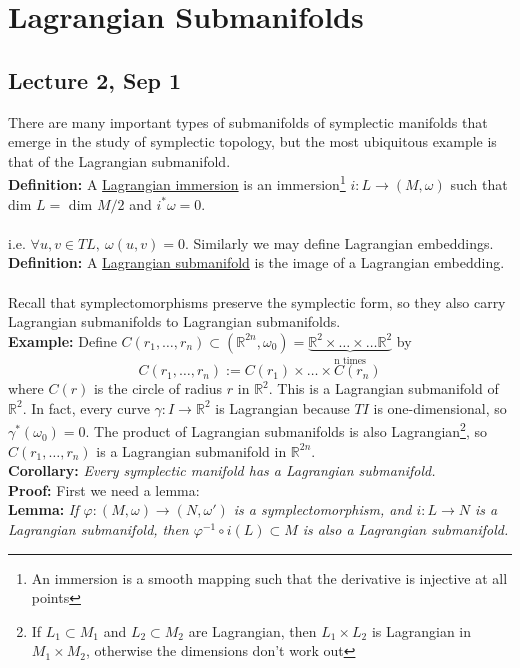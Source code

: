 \documentclass[12pt]{report}
\theoremstyle{definition}
\theoremstyle{remark}
\numberwithin{equation}{section}
\theoremstyle{definition}
\newcommand{\inv}[1]{#1^{-1}}
\newcommand{\bb}[1]{\mathbb{#1}}
\begin{document}
\chapter{Lagrangian Submanifolds}
\section*{Lecture 2, Sep 1}
\label{sec:2}
There are many important types of submanifolds of symplectic manifolds that emerge in the study of symplectic topology, but the most ubiquitous example is that of the Lagrangian submanifold. \\
\textbf{Definition: }A \underline{Lagrangian immersion} is an immersion\footnote{An immersion is a smooth mapping such that the derivative is injective at all points} $i: L \to (M,\omega)$ such that dim $L = $ dim $M/2$ and $i^* \omega = 0$. \\\\
i.e. $\forall u,v \in TL,\ \omega(u,v) = 0$. Similarly we may define Lagrangian embeddings.\\
\textbf{Definition: }A \underline{Lagrangian submanifold} is the image of a Lagrangian embedding. \\\\
Recall that symplectomorphisms preserve the symplectic form, so they also carry Lagrangian submanifolds to Lagrangian submanifolds. \\
\textbf{Example: } Define $C(r_1,\dots,r_n) \subset (\bb R^{2n},\omega_0) = \underbrace{\bb R^2 \times \dots \times \dots\bb R^2 }_{\text{n times}}$ by 
$$
	C(r_1,\dots,r_n) := C(r_1) \times \dots \times C(r_n)
$$
where $C(r)$ is the circle of radius $r$ in $\bb R^2$. This is  a Lagrangian submanifold of $\bb R^2$. In fact, every curve $\gamma: I \to \bb R^2$ is Lagrangian because $TI$ is one-dimensional, so $\gamma^*(\omega_0) = 0$. The product of Lagrangian submanifolds is also Lagrangian\footnote{If $L_1 \subset M_1$ and $L_2 \subset M_2$ are Lagrangian, then $L_1 \times L_2$ is Lagrangian in $M_1 \times M_2$, otherwise the dimensions don't work out}, so $C(r_1,\dots,r_n)$ is a Lagrangian submanifold in $\bb R^{2n}$. \\
\textbf{Corollary: }\textit{Every symplectic manifold has a Lagrangian submanifold.}\\
\textbf{Proof: }First we need a lemma: \\
\textbf{Lemma: }\textit{If $\varphi: (M,\omega) \to (N,\omega')$ is a symplectomorphism, and $i: L \to N$ is a Lagrangian submanifold, then $\inv \varphi\circ i (L) \subset M$ is also a Lagrangian submanifold.}\\
\end{document}
